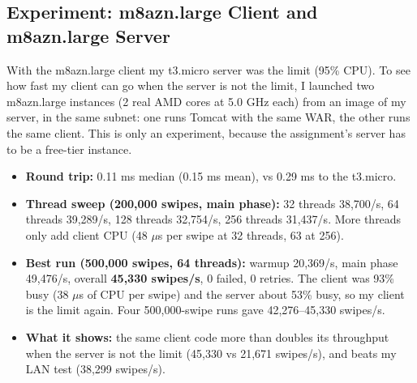\documentclass[10pt]{article}
\begin{document}
\subsection{Experiment: m8azn.large Client and m8azn.large Server}
\label{sec:m8azn-server}
With the m8azn.large client my t3.micro server was the limit (95\% CPU). To see how fast my client can go when the server is not the limit, I launched two m8azn.large instances (2 real AMD cores at 5.0 GHz each) from an image of my server, in the same subnet: one runs Tomcat with the same WAR, the other runs the same client. This is only an experiment, because the assignment's server has to be a free-tier instance.
\begin{itemize}
  \item \textbf{Round trip:} 0.11 ms median (0.15 ms mean), vs 0.29 ms to the t3.micro.
  \item \textbf{Thread sweep (200,000 swipes, main phase):} 32 threads 38,700/s, 64 threads 39,289/s, 128 threads 32,754/s, 256 threads 31,437/s. More threads only add client CPU (48 $\mu$s per swipe at 32 threads, 63 at 256).
  \item \textbf{Best run (500,000 swipes, 64 threads):} warmup 20,369/s, main phase 49,476/s, overall \textbf{45,330 swipes/s}, 0 failed, 0 retries. The client was 93\% busy (38 $\mu$s of CPU per swipe) and the server about 53\% busy, so my client is the limit again. Four 500,000-swipe runs gave 42,276--45,330 swipes/s.
  \item \textbf{What it shows:} the same client code more than doubles its throughput when the server is not the limit (45,330 vs 21,671 swipes/s), and beats my LAN test (38,299 swipes/s).
\end{itemize}
\end{document}
